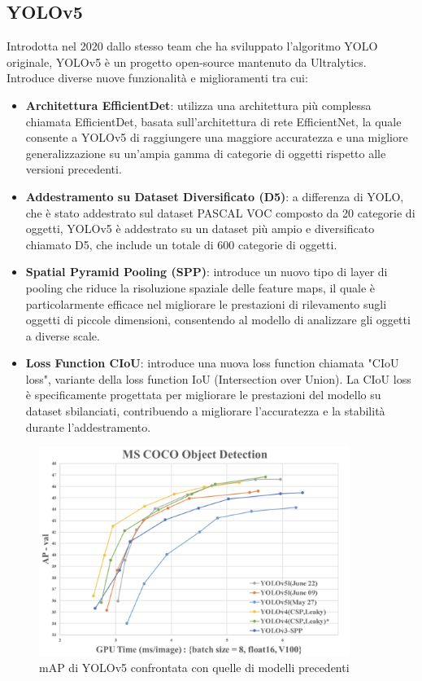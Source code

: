 \subsection{YOLOv5}
Introdotta nel 2020 dallo stesso team che ha sviluppato l'algoritmo YOLO originale, YOLOv5 è un progetto open-source mantenuto da Ultralytics\cite{22}. Introduce diverse nuove funzionalità e miglioramenti tra cui:
\begin{itemize}
  \item \textbf{Architettura EfficientDet}: utilizza una architettura più complessa chiamata EfficientDet, basata sull'architettura di rete EfficientNet, la quale consente a YOLOv5 di raggiungere una maggiore accuratezza e una migliore generalizzazione su un'ampia gamma di categorie di oggetti rispetto alle versioni precedenti.
  \item \textbf{Addestramento su Dataset Diversificato (D5)}: a differenza di YOLO, che è stato addestrato sul dataset PASCAL VOC composto da 20 categorie di oggetti, YOLOv5 è addestrato su un dataset più ampio e diversificato chiamato D5, che include un totale di 600 categorie di oggetti.
  \item \textbf{Spatial Pyramid Pooling (SPP)}: introduce un nuovo tipo di layer di pooling che riduce la risoluzione spaziale delle feature maps, il quale è particolarmente efficace nel migliorare le prestazioni di rilevamento sugli oggetti di piccole dimensioni, consentendo al modello di analizzare gli oggetti a diverse scale.
   \item \textbf{Loss Function CIoU}: introduce una nuova loss function chiamata "CIoU loss", variante della loss function IoU (Intersection over Union). La CIoU loss è specificamente progettata per migliorare le prestazioni del modello su dataset sbilanciati, contribuendo a migliorare l'accuratezza e la stabilità durante l'addestramento.
\end{itemize}

\newpage

\begin{figure}[ht]
    \centering
    \includegraphics[width=0.9\textwidth]{files/capitoli/2-yolo/assets/yolov5-benchmark.png}
    \caption{\label{fig:yolov5-benchmark}mAP di YOLOv5 confrontata con quelle di modelli precedenti\cite{23}}
\end{figure}

